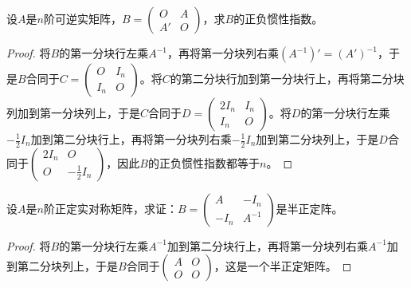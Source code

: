 \documentclass[../../main.tex]{subfiles}%
\begin{document}
\begin{example}
设\(A\)是\(n\)阶可逆实矩阵，\(B = \begin{pmatrix}
O & A \\
A' & O
\end{pmatrix}\)，求\(B\)的正负惯性指数。
\end{example}
\begin{proof}

将\(B\)的第一分块行左乘\(A^{-1}\)，再将第一分块列右乘\((A^{-1})'=(A')^{-1}\)，于是\(B\)合同于\(C = \begin{pmatrix}
O & I_n \\
I_n & O
\end{pmatrix}\)。将\(C\)的第二分块行加到第一分块行上，再将第二分块列加到第一分块列上，于是\(C\)合同于\(D = \begin{pmatrix}
2I_n & I_n \\
I_n & O
\end{pmatrix}\)。将\(D\)的第一分块行左乘\(-\frac{1}{2}I_n\)加到第二分块行上，再将第一分块列右乘\(-\frac{1}{2}I_n\)加到第二分块列上，于是\(D\)合同于\(\begin{pmatrix}
2I_n & O \\
O & -\frac{1}{2}I_n
\end{pmatrix}\)，因此\(B\)的正负惯性指数都等于\(n\)。

\end{proof}

\begin{proposition}\label{proposition:正定阵构造半正定阵}
设\(A\)是\(n\)阶正定实对称矩阵，求证：\(B = \begin{pmatrix}
A & -I_n \\
-I_n & A^{-1}
\end{pmatrix}\)是半正定阵。
\end{proposition} 
\begin{proof}

将\(B\)的第一分块行左乘\(A^{-1}\)加到第二分块行上，再将第一分块列右乘\(A^{-1}\)加到第二分块列上，于是\(B\)合同于\(\begin{pmatrix}
A & O \\
O & O
\end{pmatrix}\)，这是一个半正定矩阵。

\end{proof}
\end{document}
